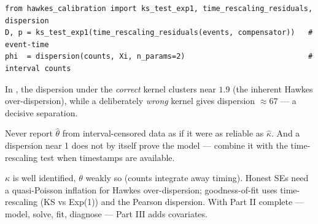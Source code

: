\begin{lstlisting}
from hawkes_calibration import ks_test_exp1, time_rescaling_residuals, dispersion
D, p = ks_test_exp1(time_rescaling_residuals(events, compensator))   # event-time
phi  = dispersion(counts, Xi, n_params=2)                            # interval counts
\end{lstlisting}

\begin{examplebox}
In , the dispersion under the \emph{correct} kernel clusters
near $1.9$ (the inherent Hawkes over-dispersion), while a deliberately
\emph{wrong} kernel gives dispersion $\approx67$ --- a decisive separation.
\end{examplebox}

\begin{pitfall}
Never report $\hat\theta$ from interval-censored data as if it were as reliable as
$\hat\kappa$. And a dispersion near 1 does not by itself prove the model --- combine
it with the time-rescaling test when timestamps are available.
\end{pitfall}

\begin{recap}
$\kappa$ is well identified, $\theta$ weakly so (counts integrate away timing).
Honest SEs need a quasi-Poisson inflation for Hawkes over-dispersion; goodness-of-fit
uses time-rescaling (KS vs Exp(1)) and the Pearson dispersion. With Part II
complete --- model, solve, fit, diagnose --- Part III adds covariates.
\end{recap}

